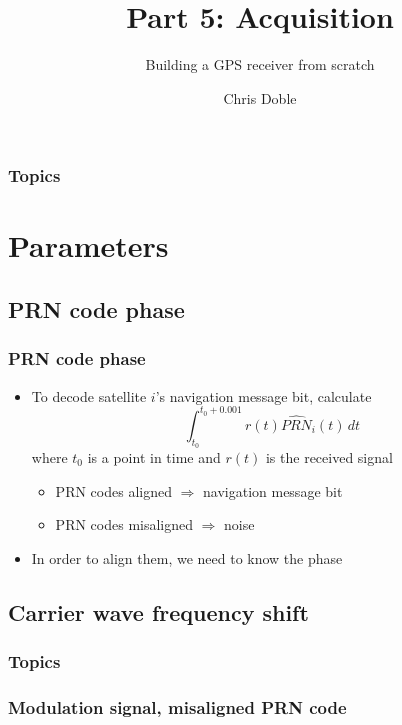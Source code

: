 \documentclass[aspectratio=169]{beamer}
\author{Chris Doble}
\date{}
\subtitle{Building a GPS receiver from scratch}
\title{Part 5: Acquisition}
\begin{document}
\frame{\titlepage}

\begin{frame}
    \frametitle{Topics}

    \tableofcontents[subsubsectionstyle=hide]
\end{frame}

\section{Parameters}

\subsection{PRN code phase}

\begin{frame}
    \frametitle{PRN code phase}

    \begin{itemize}
        \item To decode satellite $i$'s navigation message bit, calculate \[\int_{t_0}^{t_0 + 0.001} r(t) \hat{PRN}_i(t) \,d t\] where $t_0$ is a point in time and $r(t)$ is the received signal
        
        \begin{itemize}
            \item<2-> PRN codes aligned $\Rightarrow$ navigation message bit
            
            \item<3-> PRN codes misaligned $\Rightarrow$ noise
        \end{itemize}

        \item<4-> In order to align them, we need to know the phase
    \end{itemize}
\end{frame}

\subsection{Carrier wave frequency shift}

\begin{frame}
    \frametitle{Topics}

    \tableofcontents[currentsection, currentsubsection, subsubsectionstyle=show]
\end{frame}

\subsubsection{Modulation signal, misaligned PRN code}
\end{document}
